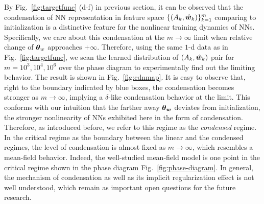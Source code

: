 \documentclass[twoside,11pt]{article}
\begin{document}
By Fig.~\ref{fig:targetfunc} (d-f) in previous section, it can be observed that the condensation of NN representation in feature space $\{(A_k,\hat{\bm{w}}_k)\}_{k=1}^m$ comparing to initialization is a distinctive feature for the nonlinear training dynamics of NNs. Specifically, we care about this condensation at the $m\to\infty$ limit when relative change of $\bm{\theta}_{w}$ approaches $+\infty$. Therefore, using the same $1$-d data as in Fig.~\ref{fig:targetfunc}, we scan the learned distribution of $(A_k,\hat{\bm{w}}_k)$ pair for $m=10^3,10^4,10^6$ over the phase diagram to experimentally find out the limiting behavior. The result is shown in Fig.~\ref{fig:cdnmap}. It is easy to observe that, right to the boundary indicated by blue boxes, the condensation becomes stronger as $m\to\infty$, implying a $\delta$-like condensation behavior at the limit. This conforms with our intuition that the farther away $\bm{\theta}_{\bm{w}}$ deviates from initialization, the stronger nonlinearity of NNs exhibited here in the form of condensation. Therefore, as introduced before, we refer to this regime as the \emph{condensed} regime. In the critical regime as the boundary between the linear and the condensed regimes, the level of condensation is almost fixed as $m\to\infty$, which resembles a mean-field behavior. Indeed, the well-studied mean-field model is one point in the critical regime shown in the phase diagram Fig.~\ref{fig:phase-diagram}. In general, the mechanism of condensation as well as its implicit regularization effect is not well understood, which remain as important open questions for the future research.
\end{document}
